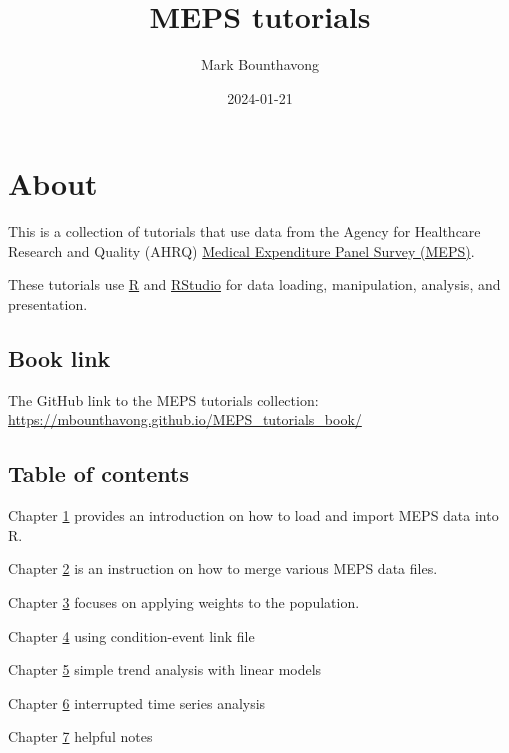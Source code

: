 \documentclass[
]{book}
\title{MEPS tutorials}
\author{Mark Bounthavong}
\date{2024-01-21}
\begin{document}
\maketitle

{
\setcounter{tocdepth}{1}
\tableofcontents
}
\hypertarget{about}{%
\chapter*{About}\label{about}}

This is a collection of tutorials that use data from the Agency for Healthcare Research and Quality (AHRQ) \href{https://meps.ahrq.gov/mepsweb/}{Medical Expenditure Panel Survey (MEPS)}.

These tutorials use \href{https://cran.r-project.org/}{R} and \href{https://posit.co/products/open-source/rstudio/}{RStudio} for data loading, manipulation, analysis, and presentation.

\hypertarget{book-link}{%
\section*{Book link}\label{book-link}}

The GitHub link to the MEPS tutorials collection: \url{https://mbounthavong.github.io/MEPS_tutorials_book/}

\hypertarget{table-of-contents}{%
\section*{Table of contents}\label{table-of-contents}}

Chapter \protect\hyperlink{intro}{1} provides an introduction on how to load and import MEPS data into R.

Chapter \protect\hyperlink{merging}{2} is an instruction on how to merge various MEPS data files.

Chapter \protect\hyperlink{weights}{3} focuses on applying weights to the population.

Chapter \protect\hyperlink{clnk}{4} using condition-event link file

Chapter \protect\hyperlink{trends}{5} simple trend analysis with linear models

Chapter \protect\hyperlink{itsa}{6} interrupted time series analysis

Chapter \protect\hyperlink{notes}{7} helpful notes
\end{document}
